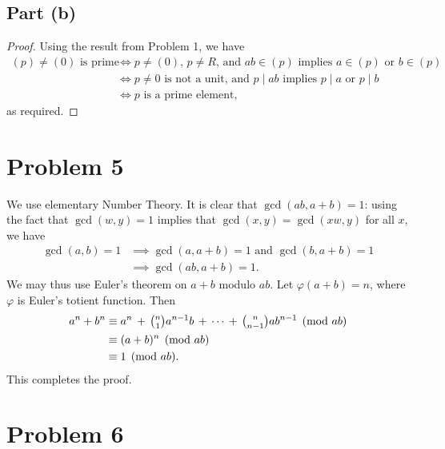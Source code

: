 \documentclass[11pt]{article}
\begin{document}

\subsection*{Part (b)}
\begin{proof}
  Using the result from Problem 1, we have
  \begin{align*}
    \text{$(p) \ne (0)$ is prime} & \iff \text{$p \ne (0)$, $p \ne R$, and $ab \in (p)$ implies $a \in (p)$ or $b \in (p)$} \\
                          & \iff \text{$p \ne 0$ is not a unit, and $p \mid ab$ implies $p \mid a$ or $p \mid b$} \\
                          & \iff \text{$p$ is a prime element},
  \end{align*}
  as required.
\end{proof}

\newpage


\section{Problem 5}

We use elementary Number Theory. It is clear that $\gcd(ab, a + b) = 1$: using the fact that $\gcd(w, y) = 1$ implies that $\gcd(x, y) = \gcd(xw, y)$ for all $x$, we have
\begin{align*}
  \gcd(a, b) = 1 & \implies \gcd(a, a + b) = 1 \text{ and } \gcd(b, a + b) = 1 \\
                 & \implies \gcd(ab, a + b) = 1.
\end{align*}
We may thus use Euler's theorem on $a + b$ modulo $ab$. Let $\varphi(a + b) = n$, where $\varphi$ is Euler's totient function. Then
\begin{align*}
  a^{n} + b^{n} & \equiv a^{n} \, + \, \tbinom{n}{1} a^{n - 1}b \, + \, \cdots \, + \, \tbinom{n}{n - 1} a b^{n - 1} \pmod{ab} \\
                & \equiv (a + b)^{n} \pmod{ab} \\
                & \equiv 1 \pmod{ab}.
\end{align*}
This completes the proof.


\section{Problem 6}
\end{document}
